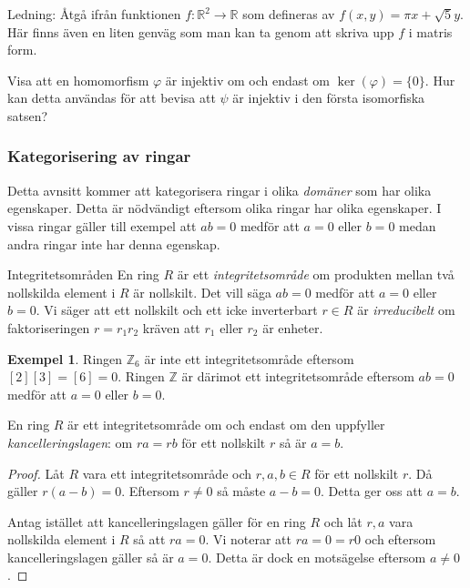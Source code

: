 \documentclass{article}
\theoremstyle{definition}
\newtheorem{exmp}[thm]{Exempel}
\begin{document}
Ledning: Åtgå ifrån funktionen $f: \mathbb{R}^2 \rightarrow \mathbb{R}$ som defineras av $f(x, y) = \pi x + \sqrt 5 y$. 
Här finns även en liten genväg som man kan ta genom att skriva upp $f$ i matris form. 

\begin{ovning}{2}
  Visa att en homomorfism $\varphi$ är injektiv om och endast om $\ker(\varphi) = \{0\}.$ Hur kan detta användas för att bevisa att 
  $\psi$ är injektiv i den första isomorfiska satsen?
\end{ovning}

\subsubsection{Kategorisering av ringar}
Detta avnsitt kommer att kategorisera ringar i olika \textit{domäner} som har olika egenskaper. 
Detta är nödvändigt eftersom olika ringar har olika egenskaper. I vissa ringar gäller till exempel att 
$ab = 0$ medför att $a = 0$ eller $b = 0$ medan andra ringar inte har denna egenskap.

\begin{mydef}{Integritetsområden}{}
  En ring $R$ är ett \textit{integritetsområde} om produkten mellan två nollskilda element i $R$ är nollskilt. Det vill säga $ab = 0$ 
  medför att $a = 0$ eller $b = 0$. Vi säger att ett nollskilt och ett icke inverterbart $r \in R$ är \textit{irreducibelt} om 
  faktoriseringen $r = r_1r_2$ kräven att $r_1$ eller $r_2$ är enheter. 
\end{mydef}

\begin{exmp}
  Ringen $\mathbb{Z}_6$ är inte ett integritetsområde eftersom $[2][3] = [6] = 0$. Ringen $\mathbb{Z}$ är därimot ett integritetsområde 
  eftersom $ab = 0$ medför att $a = 0$ eller $b = 0$.
\end{exmp}

\hypertarget{kancelleringslagen}{}
\begin{mytheo}{}{}
  En ring $R$ är ett integritetsområde om och endast om den uppfyller \textit{kancelleringslagen}: om $ra = rb$ för ett nollskilt $r$
  så är $a = b$.
\end{mytheo}

\begin{proof}
  Låt $R$ vara ett integritetsområde och $r, a, b \in R$ för ett nollskilt $r$. Då gäller $r(a -b) = 0$. Eftersom $r \neq 0$
  så måste $a -b = 0$. Detta ger oss att $a = b$. 

  Antag istället att kancelleringslagen gäller för en ring $R$ och låt $r, a$ vara nollskilda element i $R$ så att $ra = 0.$
  Vi noterar att $ra = 0 = r0$ och eftersom kancelleringslagen gäller så är $a = 0$. Detta är dock en motsägelse eftersom $a \neq 0$. 
\end{proof}
\end{document}
